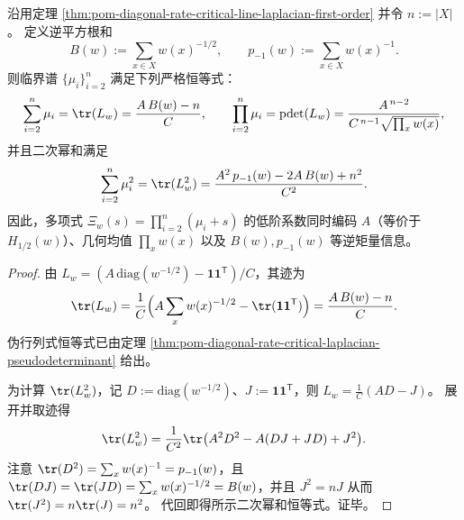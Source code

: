 \begin{proposition}[临界谱不变量的闭式表达]\label{prop:pom-diagonal-rate-critical-spectrum-invariants-closed}
沿用定理 \ref{thm:pom-diagonal-rate-critical-line-laplacian-first-order} 并令 \(n:=|X|\)。
定义逆平方根和
\[
B(w):=\sum_{x\in X}w(x)^{-1/2},
\qquad
p_{-1}(w):=\sum_{x\in X}w(x)^{-1}.
\]
则临界谱 \(\{\mu_i\}_{i=2}^n\) 满足下列严格恒等式：
\[
\sum_{i=2}^{n}\mu_i=\tr(L_w)=\frac{A\,B(w)-n}{C},
\qquad
\prod_{i=2}^{n}\mu_i=\operatorname{pdet}(L_w)=\frac{A^{\,n-2}}{C^{\,n-1}\sqrt{\prod_x w(x)}},
\]
并且二次幂和满足
\[
\sum_{i=2}^{n}\mu_i^2=\tr(L_w^2)=\frac{A^2\,p_{-1}(w)-2A\,B(w)+n^2}{C^2}.
\]
因此，多项式 \(\Xi_w(s)=\prod_{i=2}^{n}(\mu_i+s)\) 的低阶系数同时编码 \(A\)（等价于 \(H_{1/2}(w)\)）、几何均值 \(\prod_x w(x)\) 以及 \(B(w),p_{-1}(w)\) 等逆矩量信息。
\end{proposition}
\begin{proof}
由 \(L_w=(A\,\mathrm{diag}(w^{-1/2})-\mathbf 1\mathbf 1^{\mathsf T})/C\)，其迹为
\[
\tr(L_w)=\frac{1}{C}\Bigl(A\sum_x w(x)^{-1/2}-\tr(\mathbf 1\mathbf 1^{\mathsf T})\Bigr)
=\frac{A\,B(w)-n}{C}.
\]
伪行列式恒等式已由定理 \ref{thm:pom-diagonal-rate-critical-laplacian-pseudodeterminant} 给出。
\par
为计算 \(\tr(L_w^2)\)，记 \(D:=\mathrm{diag}(w^{-1/2})\)、\(J:=\mathbf 1\mathbf 1^{\mathsf T}\)，则
\(
L_w=\frac{1}{C}(AD-J)
\)。
展开并取迹得
\[
\tr(L_w^2)
=\frac{1}{C^2}\tr\bigl(A^2D^2-A(DJ+JD)+J^2\bigr).
\]
注意 \(\tr(D^2)=\sum_x w(x)^{-1}=p_{-1}(w)\)，且 \(\tr(DJ)=\tr(JD)=\sum_x w(x)^{-1/2}=B(w)\)，并且 \(J^2=nJ\) 从而 \(\tr(J^2)=n\tr(J)=n^2\)。
代回即得所示二次幂和恒等式。证毕。
\end{proof}

